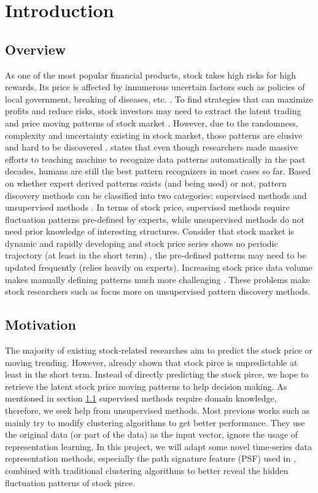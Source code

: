\chapter{Introduction}

\section{Overview}
\label{sec:overview}
As one of the most popular financial products, stock takes high risks for high rewards. Its price is affected by innumerous uncertain factors such as policies of local government, breaking of diseases, etc. \cite{zhang2017stock}. To find strategies that can maximize profits and reduce risks, stock investors may need to extract the latent trading and price moving patterns of stock market \cite{hu2015stock}.
However, due to the randomness, complexity and uncertainty existing in stock market, those patterns are elusive and hard to be discovered \cite{li2018stock}.  \cite{basu2010use} states that even though researchers made massive efforts to teaching machine to recognize data patterns automatically in the past decades, humans are still the best pattern recognizers in most cases so far. Based on whether expert derived patterns exists (and being used) or not, pattern discovery methods can be classified into two categories: supervised methods and unsupervised methods \cite{fu2001pattern}. In terms of stock price, supervised methods require fluctuation patterns pre-defined by experts, while unsupervised methods do not need prior knowledge of interesting structures. Consider that stock market is dynamic and rapidly developing and stock price series shows no periodic trajectory (at least in the short term) \cite{wei2012exotic}, the pre-defined patterns may need to be updated frequently (relies heavily on experts). Increasing stock price data volume makes manually defining patterns much more challenging \cite{basu2010use}. These problems make stock researchers such as \cite{zhang2011novel} focus more on unsupervised pattern discovery methods.

\section{Motivation}
The majority of existing stock-related researches aim to predict the stock price or moving trending. However, \cite{wei2012exotic} already shown that stock pirce is unpredictable at least in the short term. Instead of directly predicting the stock pirce, we hope to retrieve the latent stock price moving patterns to help decision making. As mentioned in section \ref{sec:overview} supervised methods require domain knowledge, therefore, we seek help from unsupervised methods. Most previous works such as \cite{fu2001pattern,zhang2011novel} mainly try to modify clustering algorithms to get better performance. They use the original data (or part of the data) as the input vector, ignore the usage of representation learning. In this project, we will adapt some novel time-series data representation methods, especially the path signature feature (PSF) used in \cite{lyons2014rough,boedihardjo2016signature,chen1958integration}, combined with traditional clustering algorithms to better reveal the hidden fluctuation patterns of stock pirce.

